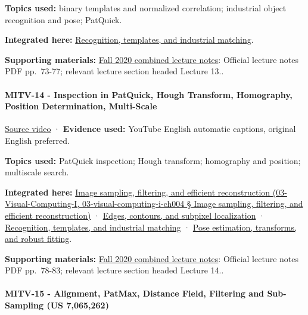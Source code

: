 \textbf{Topics used:} binary templates and normalized correlation; industrial object recognition and pose; PatQuick.

\textbf{Integrated here:} \hyperref[04-visual-computing-ii-ch030]{Recognition, templates, and industrial matching}.

\textbf{Supporting materials:} \href{https://ocw.mit.edu/courses/6-801-machine-vision-fall-2020/9ec44f69e72995c370b3797818ba01e6_MIT6_801F20_lectureNotes.pdf}{Fall 2020 combined lecture notes}: Official lecture notes PDF pp.~73-77; relevant lecture section headed Lecture 13..

\paragraph{MITV-14 - Inspection in PatQuick, Hough Transform, Homography, Position Determination, Multi-Scale}\label{mitv-14---inspection-in-patquick-hough-transform-homography-position-determination-multi-scale}

\href{https://www.youtube.com/watch?v=6SvDRpQeZrA}{Source video} · \textbf{Evidence used:} YouTube English automatic captions, original English preferred.

\textbf{Topics used:} PatQuick inspection; Hough transform; homography and position; multiscale search.

\textbf{Integrated here:} \href{}{Image sampling, filtering, and efficient reconstruction (03-Visual-Computing-I, 03-visual-computing-i-ch004 § Image sampling, filtering, and efficient reconstruction)} · \hyperref[04-visual-computing-ii-ch030]{Edges, contours, and subpixel localization} · \hyperref[04-visual-computing-ii-ch030]{Recognition, templates, and industrial matching} · \hyperref[04-visual-computing-ii-ch032]{Pose estimation, transforms, and robust fitting}.

\textbf{Supporting materials:} \href{https://ocw.mit.edu/courses/6-801-machine-vision-fall-2020/9ec44f69e72995c370b3797818ba01e6_MIT6_801F20_lectureNotes.pdf}{Fall 2020 combined lecture notes}: Official lecture notes PDF pp.~78-83; relevant lecture section headed Lecture 14..

\paragraph{MITV-15 - Alignment, PatMax, Distance Field, Filtering and Sub-Sampling (US 7,065,262)}\label{mitv-15---alignment-patmax-distance-field-filtering-and-sub-sampling-us-7065262}

